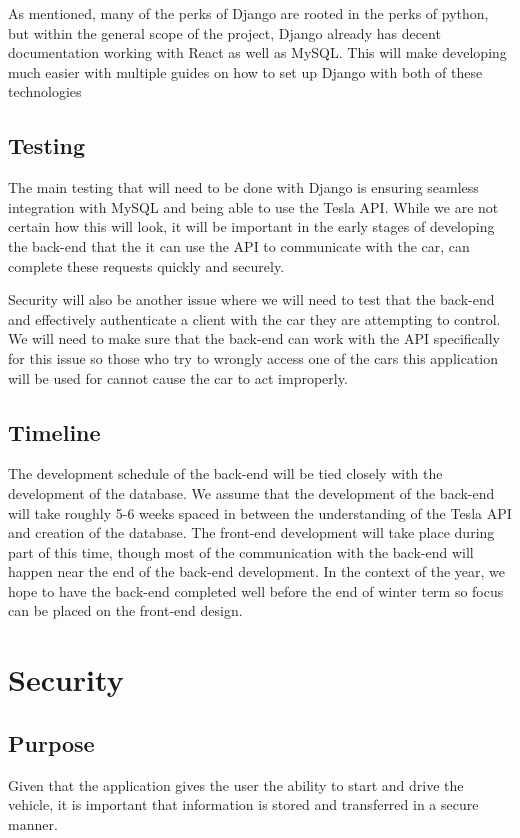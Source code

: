 \documentclass[onecolumn, draftclsnofoot,10pt, compsoc]{IEEEtran}
\begin{document}
        As mentioned, many of the perks of Django are rooted in the perks of python, but within the general scope of the project, Django already has decent documentation working with React as well as MySQL. This will make developing much easier with multiple guides on how to set up Django with both of these technologies
    \subsection{Testing}
        The main testing that will need to be done with Django is ensuring seamless integration with MySQL and being able to use the Tesla API. While we are not certain how this will look, it will be important in the early stages of developing the back-end that the it can use the API to communicate with the car, can complete these requests quickly and securely.
        
        Security will also be another issue where we will need to test that the back-end and effectively authenticate a client with the car they are attempting to control. We will need to make sure that the back-end can work with the API specifically for this issue so those who try to wrongly access one of the cars this application will be used for cannot cause the car to act improperly. 
    \subsection{Timeline}
        The development schedule of the back-end will be tied closely with the development of the database. We assume that the development of the back-end will take roughly 5-6 weeks spaced in between the understanding of the Tesla API and creation of the database. The front-end development will take place during part of this time, though most of the communication with the back-end will happen near the end of the back-end development. In the context of the year, we hope to have the back-end completed well before the end of winter term so focus can be placed on the front-end design.  
\section{Security}
    \subsection{Purpose}
    Given that the application gives the user the ability to start and drive the vehicle, it is important that information is stored and transferred in a secure manner.  
\end{document}
